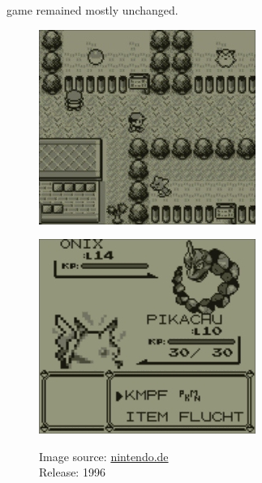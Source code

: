 game remained mostly unchanged.
\begin{figure}[ht]
  \centering
  \begin{minipage}{.5\textwidth}
    \centering
    \includegraphics[width=.95\linewidth]{images/Red-0.jpg}
    \label{fig:red0}
  \end{minipage}%
  \begin{minipage}{.5\textwidth}
    \centering
    \includegraphics[width=.95\linewidth]{images/Red-1.jpg}
    \label{fig:red1}
  \end{minipage}
  \caption*{Image source: \href{https://www.nintendo.de/Spiele/Game-Boy/Pokemon-Rote-Edition-266109.html}{nintendo.de} \\Release: 1996}
\end{figure}
